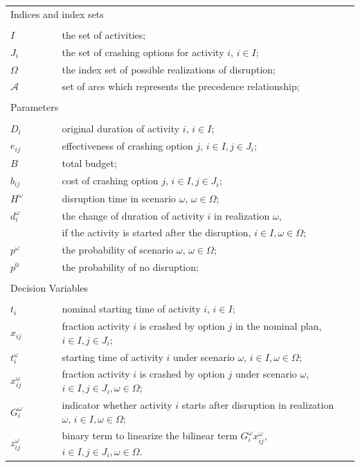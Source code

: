 \documentclass[11pt]{article}
\begin{document}
	\begin{longtable}[H]{ l l l l }
		\multicolumn{4}{l}{Indices and index sets} \\
		\\
		\(I\) & \(\qquad\) & the set of activities;&\\
		\(J_i\) & \(\qquad\) & the set of crashing options for activity \(i\), \(i \in I\);&\\
		\(\Omega\) & \(\qquad\) & the index set of possible realizations of disruption;&\\
		\(\mathcal{A}\) &\(\qquad\) & set of arcs which represents the precedence relationship;&\\
		\\
		\multicolumn{4}{l}{Parameters} \\
		\\
		\(D_{i}\)& \(\qquad\) & original duration of activity \(i\), \(i \in I\);&\\
		\(e_{ij}\) & \(\qquad\) & effectiveness of crashing option \(j\), \(i \in I, j \in J_i\);&\\
		\(B\) & \(\qquad\) & total budget;&\\
		\(b_{ij}\) & \(\qquad\) & cost of crashing option \(j\), \(i \in I, j \in J_i\);&\\
		\(H^\omega\) &\(\qquad\) & disruption time in scenario \(\omega\), \(\omega \in \Omega\);&\\
		\(d_{i}^\omega\) & \(\qquad\)&the change of duration of activity \(i\) in realization \(\omega\), &\\
		& \(\qquad\) & if the activity is started after the disruption, \(i \in I, \omega \in \Omega\);& \\
		\(p^\omega\) & \(\qquad\) & the probability of scenario \(\omega\), \(\omega \in \Omega\);& \\
		\(p^0\) & \(\qquad\) & the probability of no disruption;& \\
		\\
		\multicolumn{4}{l}{Decision Variables}\\
		\\
		\(t_{i}\) & \(\qquad\) & nominal starting time of activity \(i\), \(i \in I\);&\\
		\(x_{ij}\) & \(\qquad\) & fraction activity \(i\) is crashed by option \(j\) in the nominal plan, \(i \in I, j \in J_i\); &\\
		\(t_{i}^\omega\) & \(\qquad\) & starting time of activity \(i\) under scenario \(\omega\), \(i \in I, \omega \in \Omega\);&\\
		\(x_{ij}^\omega\) & \(\qquad\) & fraction activity \(i\) is crashed by option \(j\) under scenario \(\omega\), \(i \in I, j \in J_i, \omega \in \Omega \); &\\
		\(G_i^\omega\) & \(\qquad\) & indicator whether activity \(i\) starts after disruption in realization \(\omega\), \(i \in I, \omega \in \Omega\);&\\
		\(z_{ij}^\omega\) & \(\qquad\) & binary term to linearize the bilinear term \(G_i^\omega x_{ij}^\omega\), \(i \in I, j \in J_{i}, \omega \in \Omega\).&\\
	\end{longtable}
\end{document}
